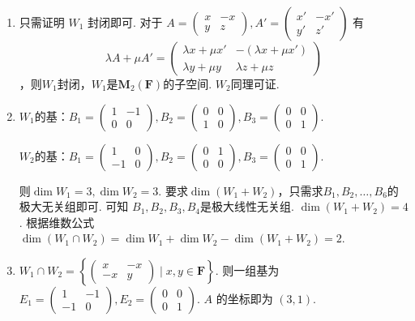 \documentclass[12pt,fontset=fandol]{ctexart}
\begin{document}
\begin{solve}
\begin{enumerate}
                \item 只需证明 $W_1$ 封闭即可. 对于 $A=\begin{pmatrix}x & -x \\ y & z\end{pmatrix},A'=\begin{pmatrix} x' & -x' \\ y' & z' \end{pmatrix}$ 有 
\[\lambda A+\mu A'=\begin{pmatrix}
                            \lambda x+\mu x' & -(\lambda x+\mu x') \\
                            \lambda y+\mu y  & \lambda z+\mu z
                        \end{pmatrix}\]
，则$W_1$封闭，$W_1$是$\mathbf{M}_2(\mathbf{F})$的子空间.	$W_2$同理可证.

                \item $W_1$的基：$B_1=\begin{pmatrix}1&-1\\0&0\end{pmatrix},B_2=\begin{pmatrix}0&0\\1&0\end{pmatrix},B_3=\begin{pmatrix}0&0\\0&1\end{pmatrix}$.

                    $W_2$的基：$B_1=\begin{pmatrix}1&0\\-1&0\end{pmatrix},B_2=\begin{pmatrix}0&1\\0&0\end{pmatrix},B_3=\begin{pmatrix}0&0\\0&1\end{pmatrix}$.

                    则$\dim W_1=3,\dim W_2=3$. 要求$\dim  (W_1+W_2)$，只需求$B_1,B_2,\ldots ,B_6$的极大无关组即可. 可知 $B_1,B_2,B_3,B_4$是极大线性无关组.	$\dim(W_1+W_2)=4$. 根据维数公式$\dim (W_1\cap W_2)=\dim W_1+\dim W_2-\dim (W_1+W_2)=2$.

                \item $W_1\cap W_2=\left\{\begin{pmatrix}x&-x\\-x&y\end{pmatrix} \mid x,y\in \mathbf{F}\right\}$. 则一组基为$E_1=\begin{pmatrix}1&-1\\-1&0\end{pmatrix},E_2=\begin{pmatrix}0&0\\0&1\end{pmatrix}$. $A$ 的坐标即为 $(3,1)$.
            \end{enumerate}
\end{solve}
\end{document}
